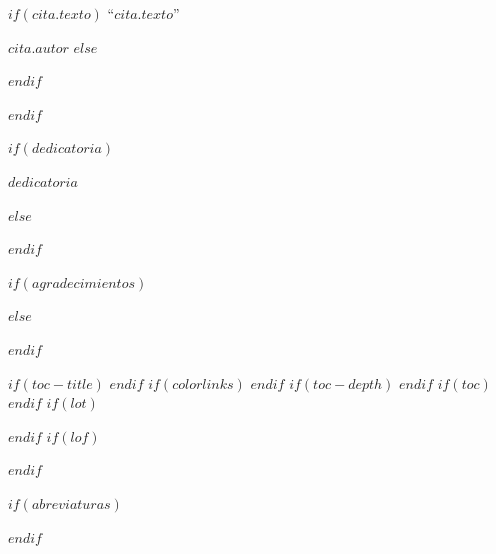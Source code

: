 \vspace*{0.2\textheight}

$if(cita.texto)$
\noindent``{\itshape $cita.texto$}''\bigbreak

\hfill {$cita.autor$}
$else$

$endif$

$endif$
\newpage


$if(dedicatoria)$

\thispagestyle{empty}

\vspace*{0.3\textheight}
\begin{center}
{$dedicatoria$}
\end{center}
$else$


$endif$
\newpage


$if(agradecimientos)$
\thispagestyle{empty}



$else$


$endif$
\newpage


\begingroup
\thispagestyle{empty}
$if(toc-title)$
\renewcommand*\contentsname{$toc-title$}
$endif$
$if(colorlinks)$
\hypersetup{linkcolor=$if(toccolor)$$toccolor$$else$$endif$}
$endif$
$if(toc-depth)$
\setcounter{tocdepth}{$toc-depth$}
$endif$
$if(toc)$
\tableofcontents
$endif$
$if(lot)$
\listoftables
$endif$
$if(lof)$
\listoffigures
$endif$
\endgroup


$if(abreviaturas)$
\thispagestyle{empty}


\noindent

$endif$
